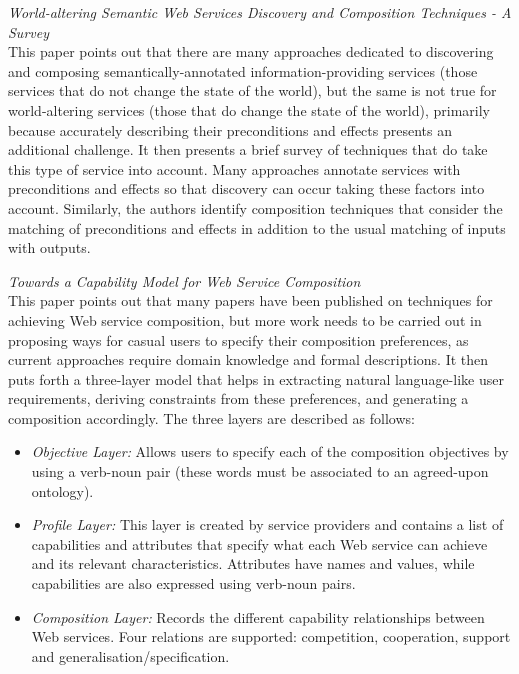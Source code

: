 \textit{World-altering Semantic Web Services Discovery and Composition Techniques - A Survey \cite{saboohi2011world}}\\
This paper points out that there are many approaches dedicated to discovering and composing semantically-annotated information-providing
services (those services that do not change the state of the world), but the same is not true for world-altering services (those that do
change the state of the world), primarily because accurately describing their preconditions and effects presents an additional challenge.
It then presents a brief survey of techniques that do take this type of service into account. Many approaches annotate services with
preconditions and effects so that discovery can occur taking these factors into account. Similarly, the authors identify composition
techniques that consider the matching of preconditions and effects in addition to the usual matching of inputs with outputs.

\textit{Towards a Capability Model for Web Service Composition \cite{li2013towards}}\\
This paper points out that many papers have been published on techniques for achieving Web service composition, but more work
needs to be carried out in proposing ways for casual users to specify their composition preferences, as current approaches require
domain knowledge and formal descriptions. It then puts forth a three-layer model that helps in extracting natural language-like
user requirements, deriving constraints from these preferences, and generating a composition accordingly. The three layers are described
as follows:

\begin{itemize}
 \item \textit{Objective Layer:} Allows users to specify each of the composition objectives by using a verb-noun pair (these words
 must be associated to an agreed-upon ontology).
 \item \textit{Profile Layer:} This layer is created by service providers and contains a list of capabilities and attributes that specify what each
 Web service can achieve and its relevant characteristics. Attributes have names and values, while capabilities are also expressed using
 verb-noun pairs.
 \item \textit{Composition Layer:} Records the different capability relationships between Web services. Four relations are supported: competition,
 cooperation, support and generalisation/specification.
\end{itemize}

